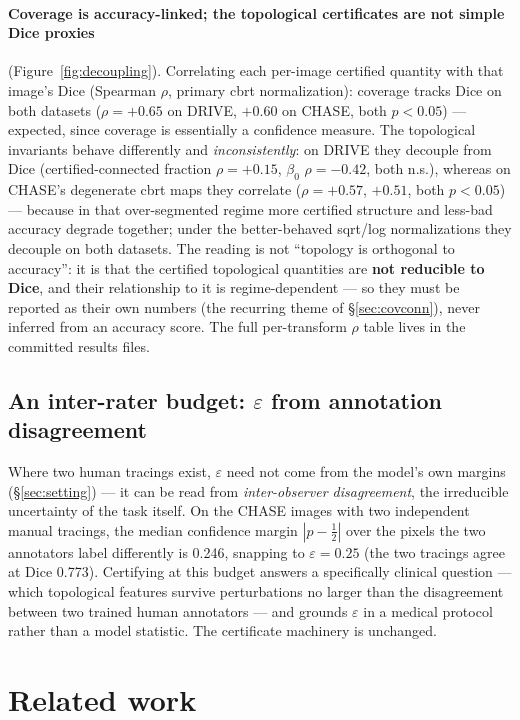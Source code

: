 \documentclass[10pt]{article}
\newcommand{\eps}{\varepsilon}
\begin{document}
\paragraph{Coverage is accuracy-linked; the topological certificates are
not simple Dice proxies} (Figure~\ref{fig:decoupling}). Correlating each
per-image certified quantity with that image's Dice (Spearman $\rho$,
primary cbrt normalization): coverage tracks Dice on both datasets
($\rho=+0.65$ on DRIVE, $+0.60$ on CHASE, both $p<0.05$) --- expected, since
coverage is essentially a confidence measure. The topological invariants
behave differently and \emph{inconsistently}: on DRIVE they
decouple from Dice (certified-connected fraction $\rho=+0.15$, $\beta_0$
$\rho=-0.42$, both n.s.), whereas on CHASE's degenerate cbrt maps they
correlate ($\rho=+0.57$, $+0.51$, both $p<0.05$) --- because in that
over-segmented regime more certified structure and less-bad accuracy
degrade together; under the better-behaved sqrt/log normalizations they
decouple on both datasets. The reading is not ``topology is
orthogonal to accuracy'': it is that the certified topological quantities
are \textbf{not reducible to Dice}, and their relationship to it is
regime-dependent --- so they must be reported as their own numbers (the
recurring theme of \S\ref{sec:covconn}), never inferred from an accuracy
score. The full per-transform $\rho$ table lives in the committed results
files.

\subsection{An inter-rater budget: $\eps$ from annotation
disagreement}\label{sec:interrater}

Where two human tracings exist, $\eps$ need not come from the model's own
margins (\S\ref{sec:setting}) --- it can be read from \emph{inter-observer
disagreement}, the irreducible uncertainty of the task itself. On the CHASE
images with two independent manual tracings, the median confidence margin
$|p-\tfrac12|$ over the pixels the two annotators label differently is
0.246, snapping to $\eps=0.25$ (the two tracings agree at Dice 0.773).
Certifying at this budget answers a specifically clinical question --- which
topological features survive perturbations no larger than the disagreement
between two trained human annotators --- and grounds $\eps$ in a medical
protocol rather than a model statistic. The certificate machinery is
unchanged.

\section{Related work}\label{sec:related}
\end{document}
